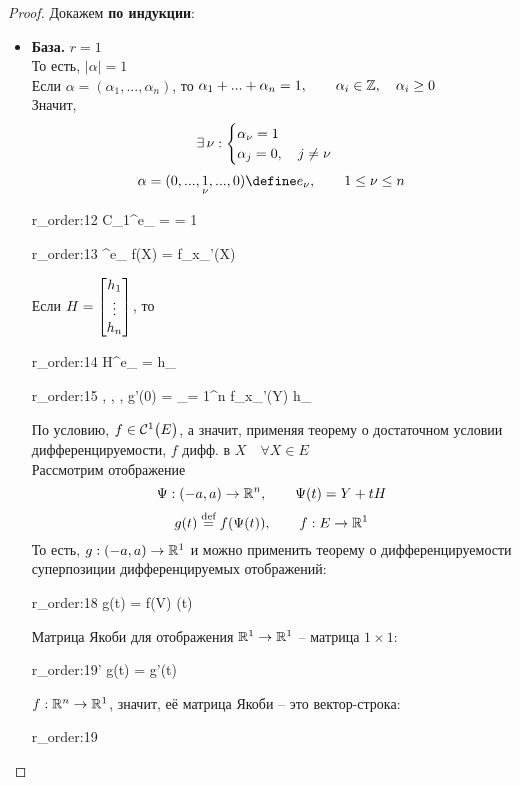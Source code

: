 \begin{proof}
	Докажем \textbf{по индукции}:
	\begin{itemize}
		\item \textbf{База.} $ r = 1 $ \\
		То есть, $ |\alpha| = 1 $ \\
		Если $ \alpha = (\alpha_1, ..., \alpha_n) $, то $ \alpha_1 + ... + \alpha_n = 1, \qquad \alpha_i \in \Z, \quad \alpha_i \ge 0 $ \\
		Значит,
		$$ \exist \nu :
		\begin{cases}
			\alpha_\nu = 1 \\
			\alpha_j = 0, \quad j \ne \nu
		\end{cases} $$
		$$ \alpha = (0, ..., \underset\nu1, ..., 0) \define e_\nu, \qquad 1 \le \nu \le n $$
		\begin{equ}{r_order:12}
			C_1^{e_\nu} =  = 1
		\end{equ}
		\begin{equ}{r_order:13}
			\partial^{e_\nu} f(X) = f_{x_\nu}'(X)
		\end{equ}
		Если $ H = \column{h_1}{h_n} $, то
		\begin{equ}{r_order:14}
			H^{e_\nu} = h_\nu
		\end{equ}
		\begin{equ}{r_order:15}
			, , ,  \implies g'(0) = \sum_{\nu = 1}^n f_{x_\nu}'(Y) h_\nu
		\end{equ}
		По условию, $ f \in \Cont[1]{E} $, а значит, применяя теорему о достаточном условии дифференцируемости, $ f $ дифф. в $ X \quad \forall X \in E $ \\
		Рассмотрим отображение
		$$ \Psi : (-a, a) \to \R^n, \qquad \Psi(t) = Y + tH $$
		$$ g(t) \bydef f(\Psi(t)), \qquad f : E \to \R^1 $$
		То есть, $ g : (-a, a) \to \R^1 $ и можно применить теорему о дифференцируемости суперпозиции дифференцируемых отображений:
		\begin{equ}{r_order:18}
			g(t) = f(V) \cdot \mathcal{D}\Psi(t)
		\end{equ}
		Матрица Якоби для отображения $ \R^1 \to \R^1 $ -- матрица $ 1 \times 1 $:
		\begin{equ}{r_order:19'}
			g(t) = g'(t)
		\end{equ}
		$ f : \R^n \to \R^1 $, значит, её матрица Якоби -- это вектор-строка:
		\begin{equ}{r_order:19}

\end{equ}
\end{itemize}
\end{proof}
